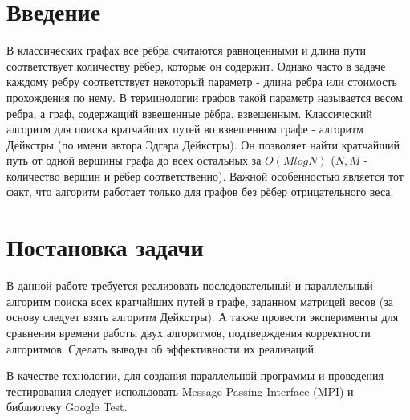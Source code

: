 \documentclass{report}
\begin{document}
\setcounter{page}{2}

\tableofcontents
\newpage

\section*{Введение}
\par В классических графах все рёбра считаются равноценными и длина пути соответствует количеству рёбер, которые он содержит. Однако часто в задаче каждому ребру соответствует некоторый параметр - длина ребра или стоимость прохождения по нему. В терминологии графов такой параметр называется весом ребра, а граф, содержащий взвешенные рёбра, взвешенным. Классический алгоритм для поиска кратчайших путей во взвешенном графе - алгоритм Дейкстры (по имени автора Эдгара Дейкстры). Он позволяет найти кратчайший путь от одной вершины графа до всех остальных за $O(MlogN)$ ($N,M$ - количество вершин и рёбер соответственно). Важной особенностью является тот факт, что алгоритм работает только для графов без рёбер отрицательного веса.
\newpage

\section*{Постановка задачи}
\par В данной работе требуется реализовать последовательный и параллельный алгоритм поиска всех кратчайших путей в графе, заданном матрицей весов (за основу следует взять алгоритм Дейкстры). А также провести эксперименты для сравнения времени работы двух алгоритмов, подтверждения корректности алгоритмов. Сделать выводы об эффективности их реализаций.
\par В качестве технологии, для создания параллельной программы и проведения тестирования следует использовать Message Passing Interface (MPI) и библиотеку Google Test.
\newpage

\end{document}
